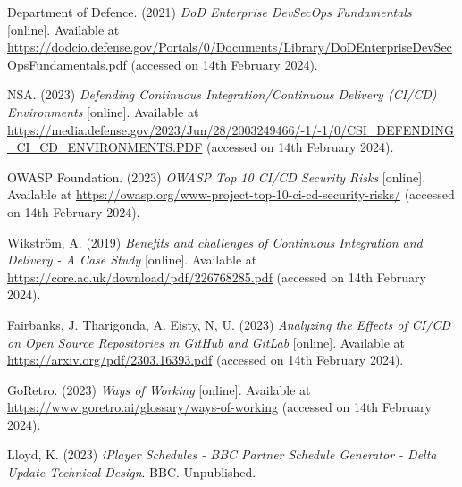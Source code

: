 \noindent Department of Defence. (2021) \textit{DoD Enterprise DevSecOps Fundamentals} [online]. Available at \url{https://dodcio.defense.gov/Portals/0/Documents/Library/DoDEnterpriseDevSecOpsFundamentals.pdf} (accessed on 14th February 2024).
\vspace{0.2cm}

\noindent NSA. (2023) \textit{Defending Continuous Integration/Continuous Delivery (CI/CD) Environments} [online]. Available at \url{https://media.defense.gov/2023/Jun/28/2003249466/-1/-1/0/CSI_DEFENDING_CI_CD_ENVIRONMENTS.PDF} (accessed on 14th February 2024).
\vspace{0.2cm}

\noindent OWASP Foundation. (2023) \textit{OWASP Top 10 CI/CD Security Risks} [online]. Available at \url{https://owasp.org/www-project-top-10-ci-cd-security-risks/} (accessed on 14th February 2024).
\vspace{0.2cm}

\noindent Wikström, A. (2019) \textit{Benefits and challenges of Continuous Integration and Delivery - A Case Study} [online]. Available at \url{https://core.ac.uk/download/pdf/226768285.pdf} (accessed on 14th February 2024).
\vspace{0.2cm}

\noindent Fairbanks, J. Tharigonda, A. Eisty, N, U. (2023) \textit{Analyzing the Effects of CI/CD on Open Source Repositories in GitHub and GitLab} [online]. Available at \url{https://arxiv.org/pdf/2303.16393.pdf} (accessed on 14th February 2024).
\vspace{0.2cm}

\noindent GoRetro. (2023) \textit{Ways of Working} [online]. Available at \url{https://www.goretro.ai/glossary/ways-of-working} (accessed on 14th February 2024).
\vspace{0.2cm}


\noindent Lloyd, K. (2023) \textit{iPlayer Schedules - BBC Partner Schedule Generator - Delta Update Technical Design}. BBC. Unpublished.
\vspace{0.2cm}

\newpage
